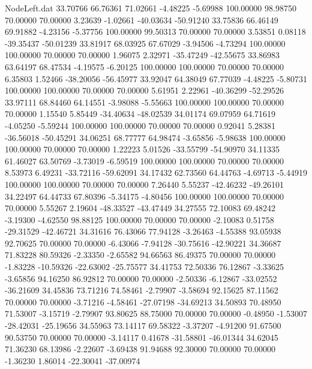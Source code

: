 \begin{filecontents}{NodeLeft.dat}
  33.70766   66.76361   71.02661    -4.48225   -5.69988  100.00000   98.98750   70.00000   70.00000    3.23639   -1.02661  -40.03634  -50.91240
  33.75836   66.46149   69.91882    -4.23156   -5.37756  100.00000   99.50313   70.00000   70.00000    3.53851    0.08118  -39.35437  -50.01239
  33.81917   68.03925   67.67029    -3.94506   -4.73294  100.00000  100.00000   70.00000   70.00000    1.96075    2.32971  -35.47249  -42.55675
  33.86983   63.64197   68.47534    -4.19575   -6.20125  100.00000  100.00000   70.00000   70.00000    6.35803    1.52466  -38.20056  -56.45977
  33.92047   64.38049   67.77039    -4.48225   -5.80731  100.00000  100.00000   70.00000   70.00000    5.61951    2.22961  -40.36299  -52.29526
  33.97111   68.84460   64.14551    -3.98088   -5.55663  100.00000  100.00000   70.00000   70.00000    1.15540    5.85449  -34.40634  -48.02539
  34.01174   69.07959   64.71619    -4.05250   -5.59244  100.00000  100.00000   70.00000   70.00000    0.92041    5.28381  -36.56018  -50.45291
  34.06251   68.77777   64.98474    -3.65856   -5.98638  100.00000  100.00000   70.00000   70.00000    1.22223    5.01526  -33.55799  -54.90970
  34.11335   61.46027   63.50769    -3.73019   -6.59519  100.00000  100.00000   70.00000   70.00000    8.53973    6.49231  -33.72116  -59.62091
  34.17432   62.73560   64.44763    -4.69713   -5.44919  100.00000  100.00000   70.00000   70.00000    7.26440    5.55237  -42.46232  -49.26101
  34.22497   64.44733   67.80396    -5.34175   -4.80456  100.00000  100.00000   70.00000   70.00000    5.55267    2.19604  -48.33527  -43.47449
  34.27555   72.10083   69.48242    -3.19300   -4.62550   98.88125  100.00000   70.00000   70.00000   -2.10083    0.51758  -29.31529  -42.46721
  34.31616   76.43066   77.94128    -3.26463   -4.55388   93.05938   92.70625   70.00000   70.00000   -6.43066   -7.94128  -30.75616  -42.90221
  34.36687   71.83228   80.59326    -2.33350   -2.65582   94.66563   86.49375   70.00000   70.00000   -1.83228  -10.59326  -22.63002  -25.75577
  34.41753   72.50336   76.12867    -3.33625   -3.65856   94.16250   86.92812   70.00000   70.00000   -2.50336   -6.12867  -33.02552  -36.21609
  34.45836   73.71216   74.58461    -2.79907   -3.58694   92.15625   87.11562   70.00000   70.00000   -3.71216   -4.58461  -27.07198  -34.69213
  34.50893   70.48950   71.53007    -3.15719   -2.79907   93.80625   88.75000   70.00000   70.00000   -0.48950   -1.53007  -28.42031  -25.19656
  34.55963   73.14117   69.58322    -3.37207   -4.91200   91.67500   90.53750   70.00000   70.00000   -3.14117    0.41678  -31.58801  -46.01344
  34.62045   71.36230   68.13986    -2.22607   -3.69438   91.94688   92.30000   70.00000   70.00000   -1.36230    1.86014  -22.30041  -37.00974

\end{filecontents}
